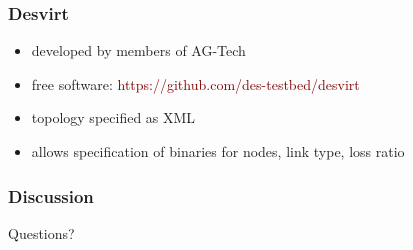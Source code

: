 \documentclass[ngerman,xcolor=svgnames]{beamer}
\begin{document}

\begin{frame}[fragile]
    \frametitle{Desvirt}
    \begin{itemize}
        \item developed by members of AG-Tech
        \item free software: \textcolor{Maroon}{https://github.com/des-testbed/desvirt}
        \item topology specified as XML
        \item allows specification of binaries for nodes, link type,
          loss ratio
    \end{itemize}
    \pause
    \vspace{20pt}
\end{frame}


\begin{frame}
 \frametitle{Discussion}
 \huge{Questions?}
\end{frame}
\end{document}

